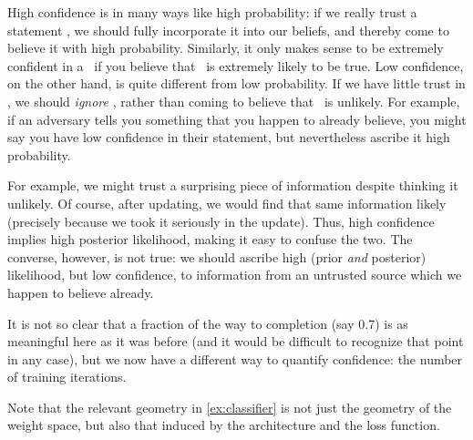 High confidence is in many ways like high probability: if we really trust a statement \stmt, we should fully incorporate it into our beliefs, and thereby come to believe it with high probability.
Similarly, it only makes sense to be extremely confident in a \stmt\ if you believe that \stmt\ is extremely likely to be true.
Low confidence, on the other hand, is quite different from low probability.
If we have little trust in \stmt, we should \emph{ignore} \stmt, rather than coming to believe that \stmt\ is unlikely.
For example, if an adversary tells you something that you happen to already believe,
you might say you have low confidence in their statement, but nevertheless ascribe it high probability.



For example, we might trust a surprising piece of information despite thinking it unlikely.
Of course, after updating, we would find that same information likely (precisely because we took it seriously in the update).
Thus, high confidence implies high posterior likelihood, making it easy to confuse the two.
The converse, however, is not true:
we should ascribe high (prior \emph{and} posterior) likelihood, but low confidence, to information from an untrusted source which we happen to believe already.


It is not so clear that a fraction of the way to completion (say 0.7) is as meaningful here as it was before (and it would be difficult to recognize that point in any case),
but we now have a different way to quantify confidence: the number of training iterations. 


Note that the relevant geometry in \cref{ex:classifier} is not just the geometry of the weight space, but also that induced by the architecture and the loss function.



